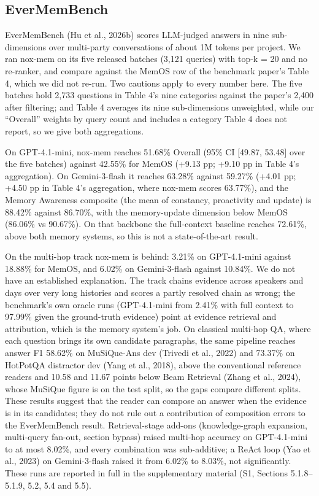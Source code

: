 \documentclass[a4paper,fleqn]{cas-sc}
\begin{document}
\subsection{EverMemBench}

EverMemBench (Hu et al., 2026b) scores LLM-judged answers in nine sub-dimensions over multi-party conversations of about 1M tokens per project. We ran nox-mem on its five released batches (3,121 queries) with top-k = 20 and no re-ranker, and compare against the MemOS row of the benchmark paper's Table 4, which we did not re-run. Two cautions apply to every number here. The five batches hold 2,733 questions in Table 4's nine categories against the paper's 2,400 after filtering; and Table 4 averages its nine sub-dimensions unweighted, while our ``Overall'' weights by query count and includes a category Table 4 does not report, so we give both aggregations.

On GPT-4.1-mini, nox-mem reaches 51.68\% Overall (95\% CI {[}49.87, 53.48{]} over the five batches) against 42.55\% for MemOS (+9.13 pp; +9.10 pp in Table 4's aggregation). On Gemini-3-flash it reaches 63.28\% against 59.27\% (+4.01 pp; +4.50 pp in Table 4's aggregation, where nox-mem scores 63.77\%), and the Memory Awareness composite (the mean of constancy, proactivity and update) is 88.42\% against 86.70\%, with the memory-update dimension below MemOS (86.06\% vs 90.67\%). On that backbone the full-context baseline reaches 72.61\%, above both memory systems, so this is not a state-of-the-art result.

On the multi-hop track nox-mem is behind: 3.21\% on GPT-4.1-mini against 18.88\% for MemOS, and 6.02\% on Gemini-3-flash against 10.84\%. We do not have an established explanation. The track chains evidence across speakers and days over very long histories and scores a partly resolved chain as wrong; the benchmark's own oracle runs (GPT-4.1-mini from 2.41\% with full context to 97.99\% given the ground-truth evidence) point at evidence retrieval and attribution, which is the memory system's job. On classical multi-hop QA, where each question brings its own candidate paragraphs, the same pipeline reaches answer F1 58.62\% on MuSiQue-Ans dev (Trivedi et al., 2022) and 73.37\% on HotPotQA distractor dev (Yang et al., 2018), above the conventional reference readers and 10.58 and 11.67 points below Beam Retrieval (Zhang et al., 2024), whose MuSiQue figure is on the test split, so the gaps compare different splits. These results suggest that the reader can compose an answer when the evidence is in its candidates; they do not rule out a contribution of composition errors to the EverMemBench result. Retrieval-stage add-ons (knowledge-graph expansion, multi-query fan-out, section bypass) raised multi-hop accuracy on GPT-4.1-mini to at most 8.02\%, and every combination was sub-additive; a ReAct loop (Yao et al., 2023) on Gemini-3-flash raised it from 6.02\% to 8.03\%, not significantly. These runs are reported in full in the supplementary material (S1, Sections 5.1.8--5.1.9, 5.2, 5.4 and 5.5).
\end{document}
